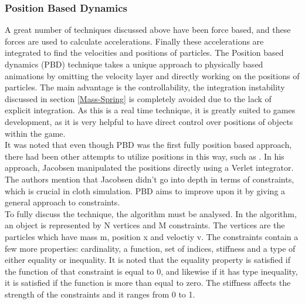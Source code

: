 \documentclass[12pt,a4paper]{article}
\begin{document}
\subsubsection{Position Based Dynamics}
\label{lrPBD}
A great number of techniques discussed above have been force based, and these forces are used to calculate accelerations. Finally these accelerations are integrated to find the velocities and positions of particles. The Position based dynamics (PBD) technique takes a unique approach to physically based animations by omitting the velocity layer and directly working on the positions of particles. \cite{muller2007position} The main advantage is the controllability, the integration instability discussed in section \ref{Mass-Spring} is completely avoided due to the lack of explicit integration. As this is a real time technique, it is greatly suited to games development, as it is very helpful to have direct control over positions of objects within the game.\\

It was noted that even though PBD was the first fully position based approach, there had been other attempts to utilize positions in this way, such as \cite{fisixArticle}. In his approach, Jacobsen manipulated the positions directly using a Verlet integrator. The authors mention that Jacobsen didn't go into depth in terms of constraints, which is crucial in cloth simulation. PBD aims to improve upon it by giving a general approach to constraints.\\

To fully discuss the technique, the algorithm must be analysed. In the algorithm, an object is represented by N vertices and M constraints. The vertices are the particles which have mass m, position x and veloctiy v. The constraints contain a few more properties: cardinality, a function, set of indices, stiffness and a type of either equality or inequality. It is noted that the equality property is satisfied if the function of that constraint is equal to 0, and likewise if it has type inequality, it is satisfied if the function is more than equal to zero. The stiffness affects the strength of the constraints and it ranges from 0 to 1.
\end{document}
